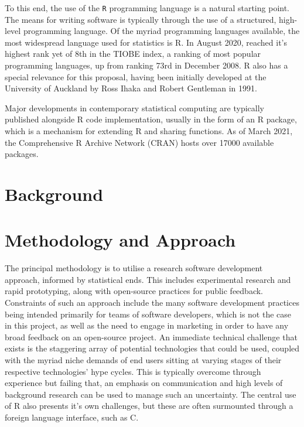 \documentclass[a4paper,10pt]{article}
\begin{document}
To this end, the use of the \texttt{R} programming language is a natural starting point.
The means for writing software is typically through the use of a structured, high-level programming language.
Of the myriad programming languages available, the most widespread language used for statistics is R.
In August 2020,  reached it's highest rank yet of 8th in the TIOBE index, a ranking of most popular programming languages, up from ranking 73rd in December 2008\cite{tiobe2021r}.
R also has a special relevance for this proposal, having been initially developed at the University of Auckland by Ross Ihaka and Robert Gentleman in 1991\cite{ihaka1996r}.

Major developments in contemporary statistical computing are typically published alongside R code implementation, usually in the form of an R package, which is a mechanism for extending R and sharing functions.
As of March 2021, the Comprehensive R Archive Network (CRAN) hosts over 17000 available packages\cite{team20:_r}.


\section{Background}



\section{Methodology and Approach}

The principal methodology is to utilise a research software development approach, informed by statistical ends.
This includes experimental research and rapid prototyping, along with open-source practices for public feedback.
Constraints of such an approach include the many software development practices being intended primarily for teams of software developers, which is not the case in this project, as well as the need to engage in marketing in order to have any broad feedback on an open-source project.
An immediate technical challenge that exists is the staggering array of potential technologies that could be used, coupled with the myriad niche demands of end users sitting at varying stages of their respective technologies' hype cycles.
This is typically overcome through experience but failing that, an emphasis on communication and high levels of background research can be used to manage such an uncertainty.
The central use of R also presents it's own challenges, but these are often surmounted through a foreign language interface, such as C.
\end{document}
